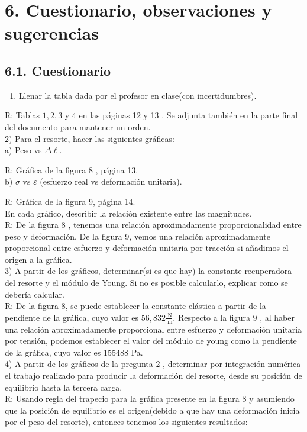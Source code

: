 \section{6. Cuestionario, observaciones y sugerencias}
\subsection{6.1. Cuestionario}
\begin{enumerate}
  \item Llenar la tabla dada por el profesor en clase(con incertidumbres).
\end{enumerate}

R: Tablas $1,2,3$ y 4 en las páginas 12 y 13 . Se adjunta también en la parte final del documento para mantener un orden.\\
2) Para el resorte, hacer las siguientes gráficas:\\
a) Peso vs $\Delta \ell$.

R: Gráfica de la figura 8 , página 13.\\
b) $\sigma$ vs $\varepsilon$ (esfuerzo real vs deformación unitaria).

R: Gráfica de la figura 9, página 14.\\
En cada gráfico, describir la relación existente entre las magnitudes.\\
R: De la figura 8 , tenemos una relación aproximadamente proporcionalidad entre peso y deformación. De la figura 9, vemos una relación aproximadamente proporcional entre esfuerzo y deformación unitaria por tracción si añadimos el origen a la gráfica.\\
3) A partir de los gráficos, determinar(si es que hay) la constante recuperadora del resorte y el módulo de Young. Si no es posible calcularlo, explicar como se debería calcular.\\
R: De la figura 8, se puede establecer la constante elástica a partir de la pendiente de la gráfica, cuyo valor es $56,832 \frac{\mathrm{~N}}{\mathrm{~m}}$. Respecto a la figura 9 , al haber una relación aproximadamente proporcional entre esfuerzo y deformación unitaria por tensión, podemos establecer el valor del módulo de young como la pendiente de la gráfica, cuyo valor es 155488 Pa.\\
4) A partir de los gráficos de la pregunta 2 , determinar por integración numérica el trabajo realizado para producir la deformación del resorte, desde su posición de equilibrio hasta la tercera carga.\\
R: Usando regla del trapecio para la gráfica presente en la figura 8 y asumiendo que la posición de equilibrio es el origen(debido a que hay una deformación inicia por el peso del resorte), entonces tenemos los siguientes resultados:

